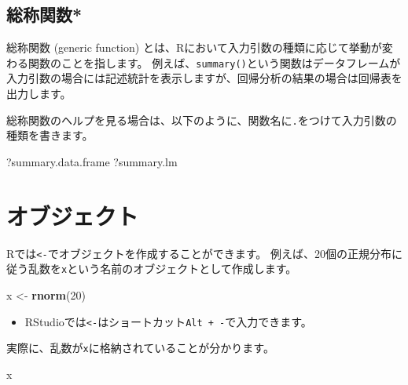 \documentclass[]{bxjsreport}
\newenvironment{Shaded}{\begin{snugshade}}{\end{snugshade}}
\newcommand{\DecValTok}[1]{\textcolor[rgb]{0.00,0.00,0.81}{#1}}
\newcommand{\KeywordTok}[1]{\textcolor[rgb]{0.13,0.29,0.53}{\textbf{#1}}}
\newcommand{\NormalTok}[1]{#1}
\newcommand{\StringTok}[1]{\textcolor[rgb]{0.31,0.60,0.02}{#1}}
\providecommand{\tightlist}{%
  \setlength{\itemsep}{0pt}\setlength{\parskip}{0pt}}
\let\asdf\section
\renewcommand{\section}{\chapter}
\let\asdff\subsection
\renewcommand{\subsection}{\asdf}
\renewcommand{\subsubsection}{\asdff}
\begin{document}
\hypertarget{ux7dcfux79f0ux95a2ux6570}{%
\subsubsection{総称関数*}\label{ux7dcfux79f0ux95a2ux6570}}

総称関数 (generic function) とは、Rにおいて入力引数の種類に応じて挙動が変わる関数のことを指します。
例えば、\texttt{summary()}という関数はデータフレームが入力引数の場合には記述統計を表示しますが、回帰分析の結果の場合は回帰表を出力します。

総称関数のヘルプを見る場合は、以下のように、関数名に\texttt{.}をつけて入力引数の種類を書きます。

\begin{Shaded}
\begin{Highlighting}[]
\NormalTok{?summary.data.frame}
\NormalTok{?summary.lm}
\end{Highlighting}
\end{Shaded}

\hypertarget{ux30aaux30d6ux30b8ux30a7ux30afux30c8}{%
\subsection{オブジェクト}\label{ux30aaux30d6ux30b8ux30a7ux30afux30c8}}

Rでは\texttt{\textless{}-}でオブジェクトを作成することができます。
例えば、20個の正規分布に従う乱数を\texttt{x}という名前のオブジェクトとして作成します。

\begin{Shaded}
\begin{Highlighting}[]
\NormalTok{x <-}\StringTok{ }\KeywordTok{rnorm}\NormalTok{(}\DecValTok{20}\NormalTok{)}
\end{Highlighting}
\end{Shaded}

\begin{itemize}
\tightlist
\item
  RStudioでは\texttt{\textless{}-}はショートカット\texttt{Alt\ +\ -}で入力できます。
\end{itemize}

実際に、乱数が\texttt{x}に格納されていることが分かります。

\begin{Shaded}
\begin{Highlighting}[]
\NormalTok{x}
\end{Highlighting}
\end{Shaded}
\end{document}
